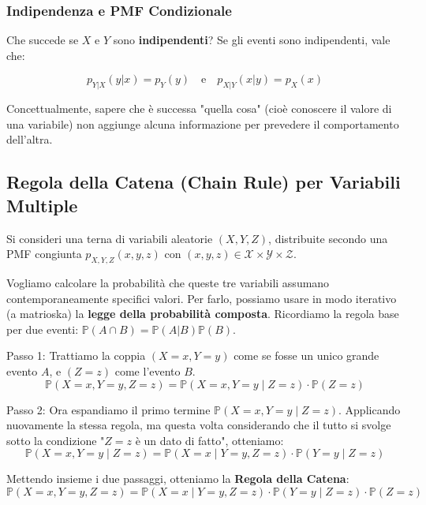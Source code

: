 \subsubsection{Indipendenza e PMF Condizionale}
Che succede se $X$ e $Y$ sono \textbf{indipendenti}?
Se gli eventi sono indipendenti, vale che:

\begin{equation}
p_{Y|X}(y|x) = p_Y(y) \quad \text{e} \quad p_{X|Y}(x|y) = p_X(x)
\end{equation}

Concettualmente, sapere che è successa "quella cosa" (cioè conoscere il valore di una variabile) non aggiunge alcuna informazione per prevedere il comportamento dell'altra.

\subsection{Regola della Catena (Chain Rule) per Variabili Multiple}

Si consideri una terna di variabili aleatorie $(X, Y, Z)$, distribuite secondo una PMF congiunta $p_{X,Y,Z}(x,y,z)$ con $(x,y,z) \in \mathcal{X} \times \mathcal{Y} \times \mathcal{Z}$.

Vogliamo calcolare la probabilità che queste tre variabili assumano contemporaneamente specifici valori. Per farlo, possiamo usare in modo iterativo (a matrioska) la \textbf{legge della probabilità composta}.
Ricordiamo la regola base per due eventi: $\mathbb{P}(A \cap B) = \mathbb{P}(A|B)\mathbb{P}(B)$.

Passo 1: Trattiamo la coppia $(X=x, Y=y)$ come se fosse un unico grande evento $A$, e $(Z=z)$ come l'evento $B$.
\begin{equation}
\mathbb{P}(X=x, Y=y, Z=z) = \mathbb{P}(X=x, Y=y \mid Z=z) \cdot \mathbb{P}(Z=z)
\end{equation}

Passo 2: Ora espandiamo il primo termine $\mathbb{P}(X=x, Y=y \mid Z=z)$. Applicando nuovamente la stessa regola, ma questa volta considerando che il tutto si svolge sotto la condizione "$Z=z$ è un dato di fatto", otteniamo:
\begin{equation}
\mathbb{P}(X=x, Y=y \mid Z=z) = \mathbb{P}(X=x \mid Y=y, Z=z) \cdot \mathbb{P}(Y=y \mid Z=z)
\end{equation}

Mettendo insieme i due passaggi, otteniamo la \textbf{Regola della Catena}:
\begin{equation}
\mathbb{P}(X=x, Y=y, Z=z) = \mathbb{P}(X=x \mid Y=y, Z=z) \cdot \mathbb{P}(Y=y \mid Z=z) \cdot \mathbb{P}(Z=z)
\end{equation}

